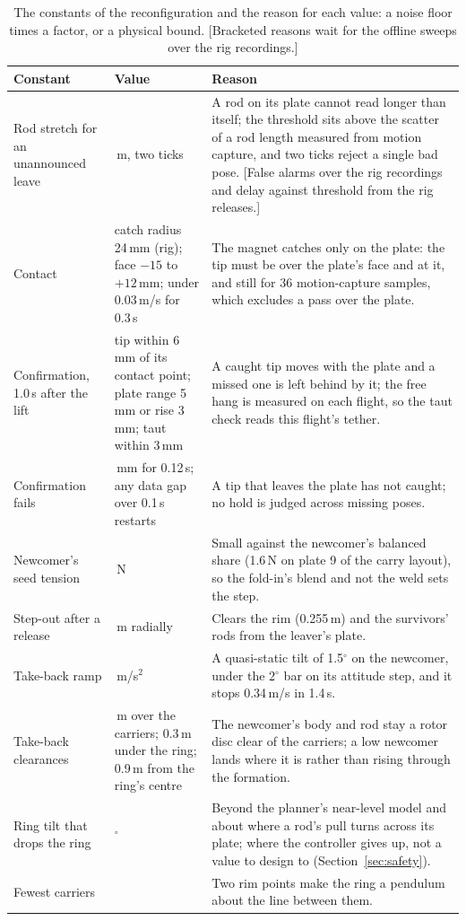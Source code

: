 \begin{table}[htbp]
\centering
\small
\caption[Reconfiguration constants and their reasons]{The constants of the reconfiguration and the reason for each
value: a noise floor times a factor, or a physical bound. [Bracketed reasons wait for the offline sweeps over the rig
recordings.]}
\label{tab:constants}
\begin{tabularx}{\textwidth}{>{\raggedright\arraybackslash}p{3.6cm}>{\raggedright\arraybackslash}p{2.4cm}>{\raggedright\arraybackslash}X}
\toprule
Constant & Value & Reason \\
\midrule
Rod stretch for an unannounced leave & 0.06\,m, two ticks & A rod on its plate cannot read longer than itself; the
threshold sits above the scatter of a rod length measured from motion capture, and two ticks reject a single bad
pose. [False alarms over the rig recordings and delay against threshold from the rig releases.] \\
Contact & catch radius 24\,mm (rig); face $-15$ to $+12$\,mm; under 0.03\,m/s for 0.3\,s & The magnet catches only on
the plate: the tip must be over the plate's face and at it, and still for 36 motion-capture samples, which excludes a
pass over the plate. \\
Confirmation, 1.0\,s after the lift & tip within 6\,mm of its contact point; plate range 5\,mm or rise 3\,mm; taut
within 3\,mm & A caught tip moves with the plate and a missed one is left behind by it; the free hang is measured on
each flight, so the taut check reads this flight's tether. \\
Confirmation fails & 45\,mm for 0.12\,s; any data gap over 0.1\,s restarts & A tip that leaves the plate has not
caught; no hold is judged across missing poses. \\
Newcomer's seed tension & 0.1\,N & Small against the newcomer's balanced share (1.6\,N on plate 9 of the carry
layout), so the fold-in's blend and not the weld sets the step. \\
Step-out after a release & 0.5\,m radially & Clears the rim (0.255\,m) and the survivors' rods from the leaver's
plate. \\
Take-back ramp & 0.25\,m/s$^2$ & A quasi-static tilt of 1.5$^\circ$ on the newcomer, under the 2$^\circ$ bar on its
attitude step, and it stops 0.34\,m/s in 1.4\,s. \\
Take-back clearances & 0.15\,m over the carriers; 0.3\,m under the ring; 0.9\,m from the ring's centre & The
newcomer's body and rod stay a rotor disc clear of the carriers; a low newcomer lands where it is rather than
rising through the formation. \\
Ring tilt that drops the ring & 30$^\circ$ & Beyond the planner's near-level model and about where a rod's pull turns
across its plate; where the controller gives up, not a value to design to (Section~\ref{sec:safety}). \\
Fewest carriers & 3 & Two rim points make the ring a pendulum about the line between them. \\
\bottomrule
\end{tabularx}
\end{table}

